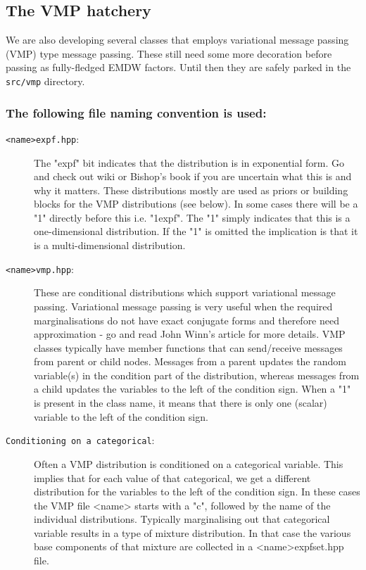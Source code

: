 \documentclass[english]{article}
\begin{document}
\subsection{The VMP hatchery}

We are also developing several classes that employs variational
message passing (VMP) type message passing. These still need some more
decoration before passing as fully-fledged EMDW factors. Until then
they are safely parked in the \texttt{src/vmp} directory.

\subsubsection*{The following file naming convention is used:}

\begin{description}
\item[\texttt{<name>expf.hpp}:]
The "expf" bit indicates that the distribution is in exponential
 form. Go and check out wiki or Bishop's book if you are uncertain
 what this is and why it matters. These distributions mostly are used
 as priors or building blocks for the VMP distributions (see
 below). In some cases there will be a "1" directly before this
 i.e. "1expf". The "1" simply indicates that this is a one-dimensional
 distribution. If the "1" is omitted the implication is that it is a
 multi-dimensional distribution.

\item[\texttt{<name>vmp.hpp}:] These are conditional distributions
  which support variational message passing. Variational message
  passing is very useful when the required marginalisations do not
  have exact conjugate forms and therefore need approximation - go and
  read John Winn's article for more details. VMP classes typically
  have member functions that can send/receive messages from parent or
  child nodes. Messages from a parent updates the random variable(s)
  in the condition part of the distribution, whereas messages from a
  child updates the variables to the left of the condition sign. When
  a "1" is present in the class name, it means that there is only one
  (scalar) variable to the left of the condition sign.

\item[\texttt{Conditioning on a categorical}:]
Often a VMP distribution is conditioned on a categorical variable.
  This implies that for each value of that categorical, we get a
 different distribution for the variables to the left of the condition
 sign. In these cases the VMP file <name> starts with a "c", followed
 by the name of the individual distributions.  Typically marginalising
 out that categorical variable results in a type of mixture
 distribution. In that case the various base components of that
 mixture are collected in a <name>expfset.hpp file.

\end{description}
\end{document}
